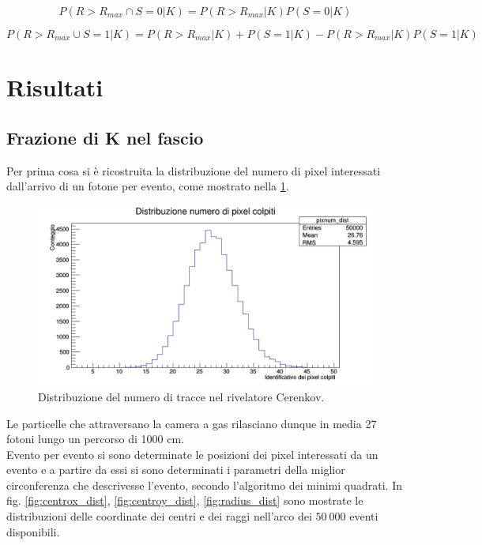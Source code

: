 \documentclass[8pt]{extarticle}
\begin{document}
\begin{equation}
P(R > R_{max} \cap S = 0 | K) = P(R > R_{max} | K) P(S = 0 | K)
\end{equation}

\begin{equation}
P(R > R_{max} \cup S = 1 | K) = P(R > R_{max}| K) + P(S = 1| K) - P(R > R_{max}| K)P(S = 1| K)
\end{equation}

\section{Risultati}
\subsection{Frazione di K nel fascio}
Per prima cosa si è ricostruita la distribuzione del numero di pixel interessati dall'arrivo di un fotone per evento, come mostrato nella \ref{fig:pixnum_dist}. \\

\begin{figure}
\begin{center}
\includegraphics[scale=0.4]{pixnum_dist}
\caption{Distribuzione del numero di tracce nel rivelatore Cerenkov.}
\label{fig:pixnum_dist}
\end{center}
\end{figure}

Le particelle che attraversano la camera a gas rilasciano dunque in media 27 fotoni lungo un percorso di 1000 cm.
\\
Evento per evento si sono determinate le posizioni dei pixel interessati da un evento e a partire da essi si sono determinati i parametri della miglior circonferenza che descrivesse l'evento, secondo l'algoritmo dei minimi quadrati. In fig. \ref{fig:centrox_dist}, \ref{fig:centroy_dist}, \ref{fig:radius_dist} sono mostrate le distribuzioni delle coordinate dei centri e dei raggi nell'arco dei $50\ 000$ eventi disponibili.\\
\end{document}
